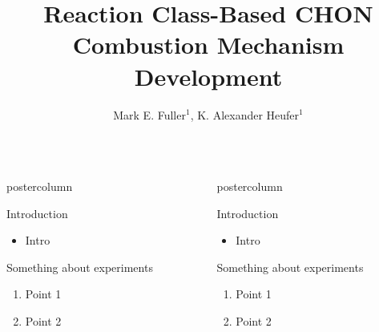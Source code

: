 \documentclass[final,hyperref={pdfpagelabels=false}]{beamer}
\title{\huge Reaction Class-Based {CHON} Combustion Mechanism Development}
\author{\LARGE Mark E. Fuller$^1$, K. Alexander Heufer$^1$}
\date{}
\institute{\Large $^1$Physico-Chemical Fundamentals of Combustion\\RWTH Aachen University}
\begin{document}
\begin{frame} %
	\begin{columns}
		\begin{column}{.48\textwidth}
    		\begin{beamercolorbox}[center,wd=\textwidth]{postercolumn}
	        	\begin{block}{\LARGE Introduction}
					\begin{itemize}
						\item Intro
					\end{itemize}	
	            \end{block}
	            \vfill
	            \begin{block}{\LARGE Something about experiments}
	           	\begin{enumerate}
	           		\item Point 1
	           		\item Point 2
	           	\end{enumerate}	
	            \end{block}
	            \vfill
  		   \end{beamercolorbox}
  	    \end{column}
		\begin{column}{.48\textwidth}
			\begin{beamercolorbox}[center,wd=\textwidth]{postercolumn}
				\begin{block}{\LARGE Introduction}
					\begin{itemize}
						\item Intro
					\end{itemize}	
				\end{block}
			\vfill
		\begin{block}{\LARGE Something about experiments}
			\begin{enumerate}
				\item Point 1
				\item Point 2
			\end{enumerate}	
		\end{block}
		\vfill
		\end{beamercolorbox}
		\end{column}
  \end{columns}


\end{frame}
\end{document}
